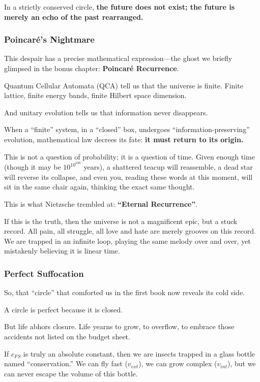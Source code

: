 In a strictly conserved circle, \textbf{the future does not exist; the future is merely an echo of the past rearranged.}

\subsubsection{Poincaré's Nightmare}

This despair has a precise mathematical expression---the ghost we briefly glimpsed in the bonus chapter: \textbf{Poincaré Recurrence}.

Quantum Cellular Automata (QCA) tell us that the universe is finite. Finite lattice, finite energy bands, finite Hilbert space dimension.

And unitary evolution tells us that information never disappears.

When a ``finite'' system, in a ``closed'' box, undergoes ``information-preserving'' evolution, mathematical law decrees its fate: \textbf{it must return to its origin.}

This is not a question of probability; it is a question of time. Given enough time (though it may be $10^{10^{100}}$ years), a shattered teacup will reassemble, a dead star will reverse its collapse, and even you, reading these words at this moment, will sit in the same chair again, thinking the exact same thought.

This is what Nietzsche trembled at: \textbf{``Eternal Recurrence''}.

If this is the truth, then the universe is not a magnificent epic, but a stuck record. All pain, all struggle, all love and hate are merely grooves on this record. We are trapped in an infinite loop, playing the same melody over and over, yet mistakenly believing it is linear time.

\subsubsection{Perfect Suffocation}

So, that ``circle'' that comforted us in the first book now reveals its cold side.

A circle is perfect because it is closed.

But life abhors closure. Life yearns to grow, to overflow, to embrace those accidents not listed on the budget sheet.

If $c_{FS}$ is truly an absolute constant, then we are insects trapped in a glass bottle named ``conservation.'' We can fly fast ($v_{ext}$), we can grow complex ($v_{int}$), but we can never escape the volume of this bottle.

